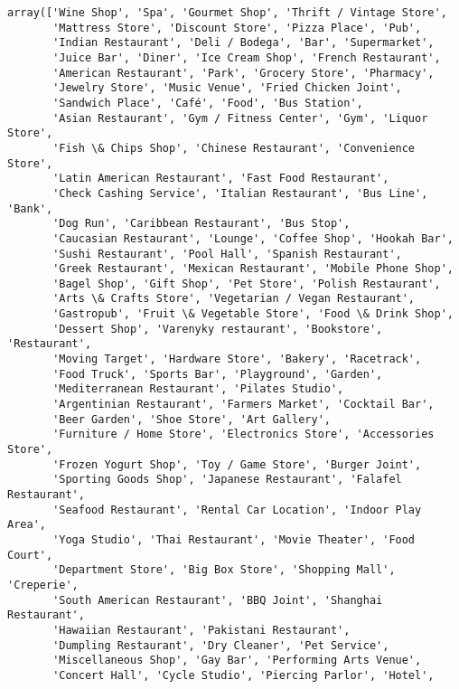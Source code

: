 \documentclass[11pt]{article}
\makeatletter
\newcommand{\boxspacing}{\kern\kvtcb@left@rule\kern\kvtcb@boxsep}
\newcommand{\prompt}[4]{
        \ttfamily\llap{{\color{#2}[#3]:\hspace{3pt}#4}}\vspace{-\baselineskip}
    }
\makeatother
\begin{document}
            \begin{tcolorbox}[breakable, size=fbox, boxrule=.5pt, pad at break*=1mm, opacityfill=0]
\prompt{Out}{outcolor}{23}{\boxspacing}
\begin{Verbatim}[commandchars=\\\{\}]
array(['Wine Shop', 'Spa', 'Gourmet Shop', 'Thrift / Vintage Store',
       'Mattress Store', 'Discount Store', 'Pizza Place', 'Pub',
       'Indian Restaurant', 'Deli / Bodega', 'Bar', 'Supermarket',
       'Juice Bar', 'Diner', 'Ice Cream Shop', 'French Restaurant',
       'American Restaurant', 'Park', 'Grocery Store', 'Pharmacy',
       'Jewelry Store', 'Music Venue', 'Fried Chicken Joint',
       'Sandwich Place', 'Café', 'Food', 'Bus Station',
       'Asian Restaurant', 'Gym / Fitness Center', 'Gym', 'Liquor Store',
       'Fish \& Chips Shop', 'Chinese Restaurant', 'Convenience Store',
       'Latin American Restaurant', 'Fast Food Restaurant',
       'Check Cashing Service', 'Italian Restaurant', 'Bus Line', 'Bank',
       'Dog Run', 'Caribbean Restaurant', 'Bus Stop',
       'Caucasian Restaurant', 'Lounge', 'Coffee Shop', 'Hookah Bar',
       'Sushi Restaurant', 'Pool Hall', 'Spanish Restaurant',
       'Greek Restaurant', 'Mexican Restaurant', 'Mobile Phone Shop',
       'Bagel Shop', 'Gift Shop', 'Pet Store', 'Polish Restaurant',
       'Arts \& Crafts Store', 'Vegetarian / Vegan Restaurant',
       'Gastropub', 'Fruit \& Vegetable Store', 'Food \& Drink Shop',
       'Dessert Shop', 'Varenyky restaurant', 'Bookstore', 'Restaurant',
       'Moving Target', 'Hardware Store', 'Bakery', 'Racetrack',
       'Food Truck', 'Sports Bar', 'Playground', 'Garden',
       'Mediterranean Restaurant', 'Pilates Studio',
       'Argentinian Restaurant', 'Farmers Market', 'Cocktail Bar',
       'Beer Garden', 'Shoe Store', 'Art Gallery',
       'Furniture / Home Store', 'Electronics Store', 'Accessories Store',
       'Frozen Yogurt Shop', 'Toy / Game Store', 'Burger Joint',
       'Sporting Goods Shop', 'Japanese Restaurant', 'Falafel Restaurant',
       'Seafood Restaurant', 'Rental Car Location', 'Indoor Play Area',
       'Yoga Studio', 'Thai Restaurant', 'Movie Theater', 'Food Court',
       'Department Store', 'Big Box Store', 'Shopping Mall', 'Creperie',
       'South American Restaurant', 'BBQ Joint', 'Shanghai Restaurant',
       'Hawaiian Restaurant', 'Pakistani Restaurant',
       'Dumpling Restaurant', 'Dry Cleaner', 'Pet Service',
       'Miscellaneous Shop', 'Gay Bar', 'Performing Arts Venue',
       'Concert Hall', 'Cycle Studio', 'Piercing Parlor', 'Hotel',

\end{Verbatim}
\end{tcolorbox}
\end{document}
